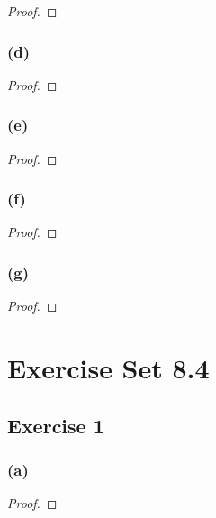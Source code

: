 \documentclass[14pt]{extarticle}
\begin{document}
\begin{proof}

\end{proof}

\subsubsection{(d)}

\begin{proof}

\end{proof}

\subsubsection{(e)}

\begin{proof}

\end{proof}

\subsubsection{(f)}

\begin{proof}

\end{proof}

\subsubsection{(g)}

\begin{proof}

\end{proof}

\section{Exercise Set 8.4}

\subsection{Exercise 1}

\subsubsection{(a)}

\begin{proof}

\end{proof}
\end{document}
